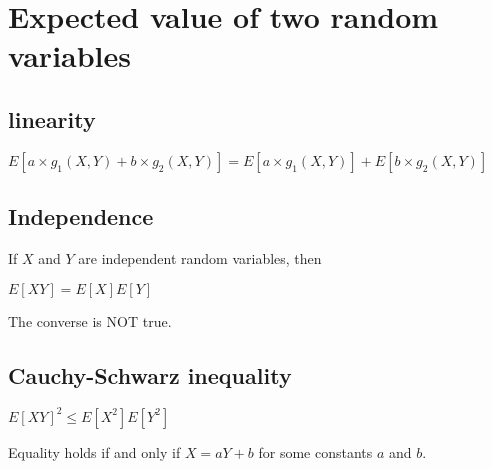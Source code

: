 \section{Expected value of two random variables}
\subsection*{linearity}
    $E[a \times g_1(X, Y)+ b \times g_2(X, Y)] = E[a \times g_1(X, Y)] + E[b \times g_2(X, Y)]$
\subsection*{Independence}
    If $X$ and $Y$ are independent random variables, then

    $E[XY] = E[X] E[Y]$

    The converse is NOT true.

\subsection*{Cauchy-Schwarz inequality}
    $E[XY]^2 \leq E[X^2]E[Y^2]$

    Equality holds if and only if $X = aY + b$ for some constants $a$ and $b$.